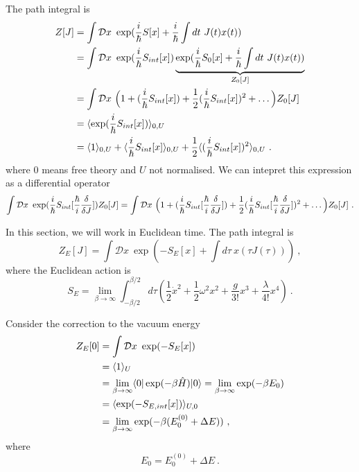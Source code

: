     The path integral is 
    \begin{equation*}
    \begin{aligned}
        Z[J] & = \int \mathcal D x ~ \exp(\frac{i}{\hbar} S[x] + \frac{i}{\hbar} \int dt ~ J(t) x(t)) \\ & = \int \mathcal D x ~ \exp(\frac{i}{\hbar} S_{int}[x]) \underbrace{\exp(\frac{i}{\hbar} S_0[x] + \frac{i}{\hbar} \int dt ~ J(t) x(t))}_{Z_0[J]} \\ & = \int \mathcal D x ~ \Big ( 1 + (\frac{i}{\hbar} S_{int}[x]) + \frac{1}{2} (\frac{i}{\hbar} S_{int}[x])^2 + \ldots \Big ) Z_0[J] \\ & = \langle\exp(\frac{i}{\hbar} S_{int}[x])\rangle_{0, U} \\ & = \langle1\rangle_{0, U} + \langle\frac{i}{\hbar} S_{int}[x]\rangle_{0, U} + \frac{1}{2} \langle(\frac{i}{\hbar} S_{int}[x])^2\rangle_{0, U} ~.
    \end{aligned}
    \end{equation*}
    where $0$ means free theory and $U$ not normalised. We can intepret this expression as a differential operator
    \begin{equation*}
        \int \mathcal D x ~ \exp(\frac{i}{\hbar} S_{int}[\frac{\hbar}{i} \frac{\delta }{\delta J}]) Z_0[J] = \int \mathcal D x ~ \Big ( 1 + (\frac{i}{\hbar} S_{int}[\frac{\hbar}{i} \frac{\delta }{\delta J}]) + \frac{1}{2} (\frac{i}{\hbar} S_{int}[\frac{\hbar}{i} \frac{\delta }{\delta J}])^2 + \ldots \Big ) Z_0[J] ~.
    \end{equation*}


    In this section, we will work in Euclidean time. The path integral is
    \begin{equation*}
        Z_E[J] = \int \mathcal D x ~ \exp(-S_E[x] + \int d\tau ~ x(\tau J(\tau))) ~,
    \end{equation*}
    where the Euclidean action is 
    \begin{equation*}
        S_E = \lim_{\beta \rightarrow \infty} \int_{-\beta/2}^{\beta/2} d\tau (\frac{1}{2} \dot x^2 + \frac{1}{2} \omega^2 x^2 + \frac{g}{3!} x^3 + \frac{\lambda}{4!} x^4) ~.
    \end{equation*}

    Consider the correction to the vacuum energy 
    \begin{equation*}
    \begin{aligned}
        Z_E[0] & = \int \mathcal D x ~ \exp(- S_E[x]) \\ & = \langle1\rangle_U \\ & = \lim_{\beta \rightarrow \infty} \langle0\vert \exp(- \beta \hat H) \vert0\rangle = \lim_{\beta \rightarrow \infty} \exp(- \beta E_0) \\ & = \langle\exp(- S_{E, int} [x])\rangle _{U, 0} \\ & = \lim_{\beta \rightarrow \infty} \exp(- \beta (E_0^{(0)} + \Delta E)) ~,
    \end{aligned}
    \end{equation*}
    where 
    \begin{equation*}
        E_0 = E_0^{(0)} + \Delta E ~.
    \end{equation*}

